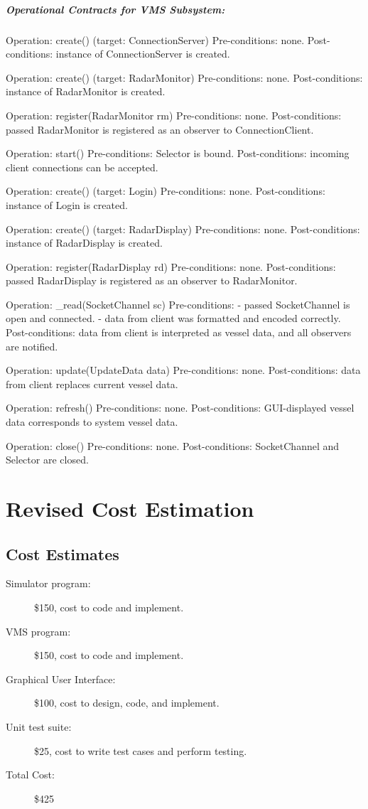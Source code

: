 \documentclass{article}
\begin{document}
\subparagraph{Operational Contracts for VMS Subsystem:}

Operation: create() (target: ConnectionServer)
Pre-conditions: none.
Post-conditions: instance of ConnectionServer is created.

Operation: create() (target: RadarMonitor)
Pre-conditions: none.
Post-conditions: instance of RadarMonitor is created.

Operation: register(RadarMonitor rm)
Pre-conditions: none.
Post-conditions: passed RadarMonitor is registered as an observer to ConnectionClient.

Operation: start()
Pre-conditions: Selector is bound.
Post-conditions: incoming client connections can be accepted.

Operation: create() (target: Login)
Pre-conditions: none.
Post-conditions: instance of Login is created.

Operation: create() (target: RadarDisplay)
Pre-conditions: none.
Post-conditions: instance of RadarDisplay is created.

Operation: register(RadarDisplay rd)
Pre-conditions: none.
Post-conditions: passed RadarDisplay is registered as an observer to RadarMonitor.

Operation: \_read(SocketChannel sc)
Pre-conditions:
- passed SocketChannel is open and connected.
- data from client was formatted and encoded correctly.
Post-conditions: data from client is interpreted as vessel data, and all observers are notified.

Operation: update(UpdateData data)
Pre-conditions: none.
Post-conditions: data from client replaces current vessel data.

Operation: refresh()
Pre-conditions: none.
Post-conditions: GUI-displayed vessel data corresponds to system vessel data.

Operation: close()
Pre-conditions: none.
Post-conditions: SocketChannel and Selector are closed.

\section{Revised Cost Estimation} %

\subsection{Cost Estimates}

\begin{description}
  \item[Simulator program:] \$150, cost to code and implement.
  \item[VMS program:] \$150, cost to code and implement.
  \item[Graphical User Interface:] \$100, cost to design, code, and implement.
  \item[Unit test suite:] \$25, cost to write test cases and perform testing.
  \item[Total Cost:] \$425
\end{description}
\end{document}
